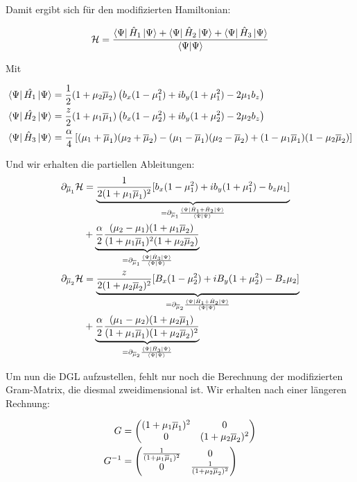 Damit ergibt sich für den modifizierten Hamiltonian: 

\begin{align}
    \mathcal{H} &= \frac{\bra{\Psi}\hat{H}_1\ket{\Psi}+ \bra{\Psi}\hat{H}_2\ket{\Psi} +\bra{\Psi}\hat{H}_3\ket{\Psi}}{\bra{\Psi}\ket{\Psi}}\\
\end{align}

Mit

\begin{align}
   \bra{\Psi}\hat{H_1}\ket{\Psi} &= \frac{1}{2}(1+\mu_2\overline{\mu}_2)\left(b_x(1-\mu_1^2) + ib_y(1+\mu_1^2) - 2\mu_1 b_z\right)\\
   \bra{\Psi}\hat{H_2}\ket{\Psi} &= \frac{z}{2}(1+\mu_1\overline{\mu}_1)\left(b_x(1-\mu_2^2) + ib_y(1+\mu_2^2) - 2\mu_2 b_z\right)\\
   \bra{\Psi}\hat{H}_3\ket{\Psi} &= \frac{\alpha}{4}\left[( \mu_1 + \overline{\mu}_1)( \mu_2 + \overline{\mu}_2) - (\mu_1-\overline{\mu}_1)(\mu_2 - \overline{\mu}_2) + (1-\mu_1\overline{\mu}_1)(1-\mu_2\overline{\mu}_2)\right]
\end{align}  


Und wir erhalten die partiellen Ableitungen:
\begin{align}
    \partial_{\overline{\mu}_1}\mathcal{H} &= \underbrace{\frac{1}{2(1+\mu_1\overline{\mu}_1)^2}[b_x(1-\mu_1^2) + ib_y(1+\mu_1^2) - b_z\mu_1]}_{= \partial_{\overline{\mu}_1} \frac{\bra{\Psi}\hat{H}_1 + \hat{H}_2\ket{\Psi}}{\bra{\Psi}\ket{\Psi}}} \\
    &+ \underbrace{\frac{\alpha}{2}\frac{(\mu_2 -\mu_1)(1+\mu_1\overline{\mu}_2)}{(1+\mu_1\overline{\mu}_1)^2(1+\mu_2\overline{\mu}_2)}}_{= \partial_{\overline{\mu}_1} \frac{\bra{\Psi}\hat{H}_3\ket{\Psi}}{\bra{\Psi}\ket{\Psi}}}\\
    \partial_{\overline{\mu}_2}\mathcal{H} &= \underbrace{\frac{z}{2(1+\mu_2\overline{\mu}_2)^2}[B_x(1-\mu_2^2) + iB_y(1+\mu_2^2) - B_z\mu_2]}_{= \partial_{\overline{\mu}_2} \frac{\bra{\Psi}\hat{H}_1 + \hat{H}_2\ket{\Psi}}{\bra{\Psi}\ket{\Psi}}} \\
    &+ \underbrace{\frac{\alpha}{2}\frac{(\mu_1 -\mu_2)(1+\mu_2\overline{\mu}_1)}{(1+\mu_1\overline{\mu}_1)(1+\mu_2\overline{\mu}_2)^2}}_{= \partial_{\overline{\mu}_2} \frac{\bra{\Psi}\hat{H}_3\ket{\Psi}}{\bra{\Psi}\ket{\Psi}}}
\end{align}

Um nun die DGL aufzustellen, fehlt nur noch die Berechnung der modifizierten Gram-Matrix, die diesmal zweidimensional ist. 
Wir erhalten nach einer längeren Rechnung:

\begin{align}
    G &=
    \begin{pmatrix}
        (1+\mu_1\overline{\mu}_1)^2 & 0 \\
        0 &(1+\mu_2\overline{\mu}_2)^2
    \end{pmatrix} \\
    G^{-1} &=
    \begin{pmatrix}
        \frac{1}{(1+\mu_1\overline{\mu}_1)^2} & 0 \\
        0 &\frac{1}{(1+\mu_2\overline{\mu}_2)^2}
    \end{pmatrix}
\end{align}

